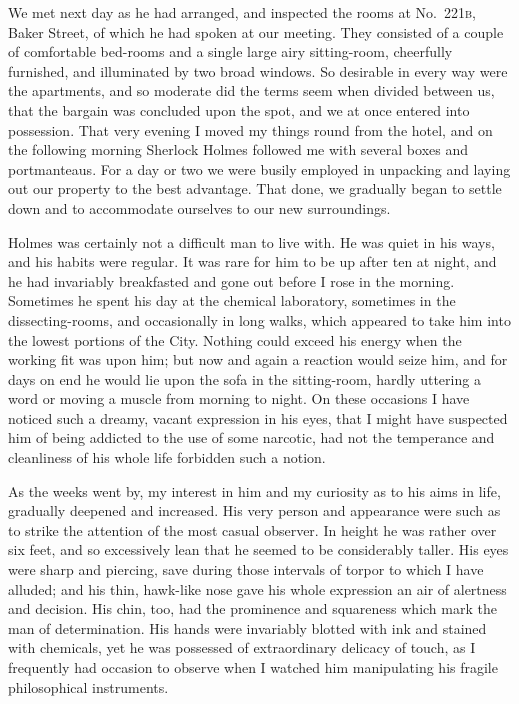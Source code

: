 \documentclass[12pt,english,oneside]{book}
\newcommand{\noun}[1]{\textsc{#1}}
\begin{document}

We met next day as he had arranged, and inspected the rooms at No.\ \noun{221b},
Baker Street, of which he had spoken at our meeting. They consisted
of a couple of comfortable bed-rooms and a single large airy sitting-room,
cheerfully furnished, and illuminated by two broad windows. So desirable
in every way were the apartments, and so moderate did the terms seem
when divided between us, that the bargain was concluded upon the spot,
and we at once entered into possession. That very evening I moved
my things round from the hotel, and on the following morning Sherlock
Holmes followed me with several boxes and portmanteaus. For a day
or two we were busily employed in unpacking and laying out our property
to the best advantage. That done, we gradually began to settle down
and to accommodate ourselves to our new surroundings.

Holmes was certainly not a difficult man to live with. He was quiet
in his ways, and his habits were regular. It was rare for him to be
up after ten at night, and he had invariably breakfasted and gone
out before I rose in the morning. Sometimes he spent his day at the
chemical laboratory, sometimes in the dissecting-rooms, and occasionally
in long walks, which appeared to take him into the lowest portions
of the City. Nothing could exceed his energy when the working fit
was upon him; but now and again a reaction would seize him, and for
days on end he would lie upon the sofa in the sitting-room, hardly
uttering a word or moving a muscle from morning to night. On these
occasions I have noticed such a dreamy, vacant expression in his eyes,
that I might have suspected him of being addicted to the use of some
narcotic, had not the temperance and cleanliness of his whole life
forbidden such a notion.

As the weeks went by, my interest in him and my curiosity as to his
aims in life, gradually deepened and increased. His very person and
appearance were such as to strike the attention of the most casual
observer. In height he was rather over six feet, and so excessively
lean that he seemed to be considerably taller. His eyes were sharp
and piercing, save during those intervals of torpor to which I have
alluded; and his thin, hawk-like nose gave his whole expression an
air of alertness and decision. His chin, too, had the prominence and
squareness which mark the man of determination. His hands were invariably
blotted with ink and stained with chemicals, yet he was possessed
of extraordinary delicacy of touch, as I frequently had occasion to
observe when I watched him manipulating his fragile philosophical
instruments.
\end{document}
